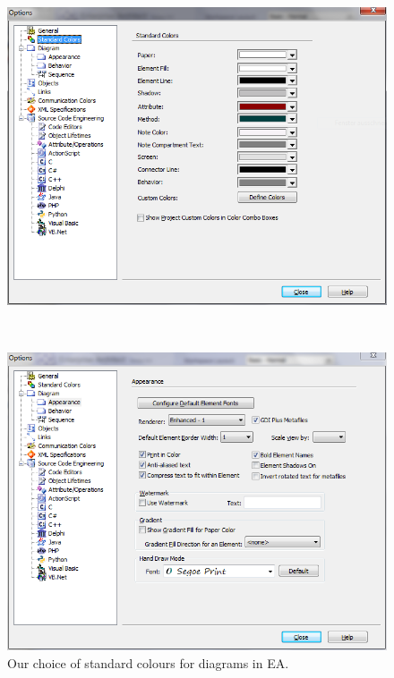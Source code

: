 \begin{figure}[htbp]
\centering
\begin{minipage}[b]{0.3\textheight}
  \centering
  \includegraphics[width=\textwidth]{pics/installationAndSetup/standardColours}
  \caption{Our choice of standard colours for diagrams in EA.}
  \label{fig_standardColoursEA}
\end{minipage}
\\
\vspace{0.5cm}
\begin{minipage}[b]{0.3\textheight}
  \centering
  \includegraphics[width=\textwidth]{pics/installationAndSetup/standardAppearance}

\end{minipage}
\end{figure}
